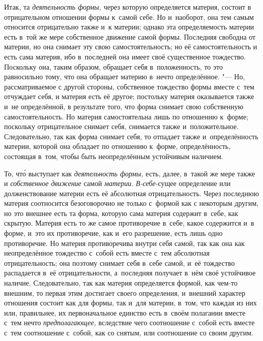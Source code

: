 Итак, та {\em деятельность формы,} через которую определяется материя, состоит
в отрицательном отношении формы к~самой себе. Но и~наоборот, она тем самым
относится отрицательно также и~к материи; однако эта определяемость материи
есть в~той же мере собственное движение самой формы. Последняя свободна от
материи, но она снимает эту свою самостоятельность; но её самостоятельность и
есть сама материя, ибо в~последней она имеет своё существенное тождество.
Поскольку она, таким образом, обращает себя в~положенность, то это равносильно
тому, что она обращает материю в~нечто определённое. "--- Но, рассматриваемое с
другой стороны, собственное тождество формы вместе с~тем отчуждает себя, и
материя есть её другое; постольку материя оказывается также и~не определённой,
в результате того, что форма снимает свою собственную самостоятельность. Но
материя самостоятельна лишь по отношению к~форме; поскольку отрицательное
снимает себя, снимается также и~положительное. Следовательно, так как форма
снимает себя, то отпадает также и~определённость материи, которой она обладает
по отношению к~форме, определённость, состоящая в~том, чтобы быть
неопределённым устойчивым наличием.

То, чт\'{о} выступает как {\em деятельность формы,} есть, далее, в~такой же
мере также и {\em собственное движение} самой {\em материи}. {\em В-себе}-сущее
определение или долженствование материи есть её абсолютная отрицательность.
Через последнюю материя соотносится безоговорочно не только с~формой как с
некоторым другим, но это внешнее есть та форма, которую сама материя содержит
в~себе, как скрытую. Материя есть то же самое противоречие в~себе, какое
содержится и~в форме, и~это их противоречие, как и~его разрешение, есть лишь
одно противоречие. Но материя противоречива внутри себя самой, так как она как
неопределённое тождество с~собой есть вместе с~тем абсолютная отрицательность;
она поэтому снимает себя в~себе самой, и~её тождество распадается в~её
отрицательности, а~последняя получает в~нём своё устойчивое наличие.
Следовательно, так как материя определяется формой, как чем-то внешним, то
первая этим достигает своего определения, и~внешний характер отношения состоит
как для формы, так и~для материи, в~том, что каждая из них или, правильнее, их
первоначальное единство есть в~своём полагании вместе с~тем нечто
{\em предполагающее,} вследствие чего соотношение с~собой есть вместе с~тем
соотношение с~собой, как со снятым, или соотношение со своим другим.

